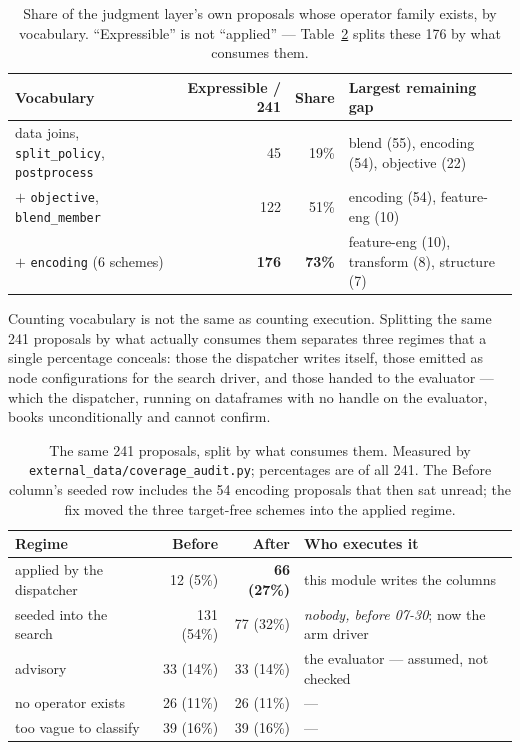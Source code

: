 \documentclass[11pt,a4paper]{article}
\begin{document}
\begin{table}[H]
\centering\small
\caption{Share of the judgment layer's own proposals whose operator family exists, by vocabulary. ``Expressible'' is not ``applied'' --- Table~\ref{tab:regime} splits these 176 by what consumes them.}
\label{tab:coverage}
\begin{tabular}{@{}lrrl@{}}
\toprule
\textbf{Vocabulary} & \textbf{Expressible / 241} & \textbf{Share} & \textbf{Largest remaining gap} \\
\midrule
data joins, \texttt{split\_policy}, \texttt{postprocess} & 45 & 19\% & blend (55), encoding (54), objective (22) \\
$+$ \texttt{objective}, \texttt{blend\_member} & 122 & 51\% & encoding (54), feature-eng (10) \\
$+$ \texttt{encoding} (6 schemes) & \textbf{176} & \textbf{73\%} & feature-eng (10), transform (8), structure (7) \\
\bottomrule
\end{tabular}
\end{table}

Counting vocabulary is not the same as counting execution. Splitting the same 241 proposals by
what actually consumes them separates three regimes that a single percentage conceals: those the
dispatcher writes itself, those emitted as node configurations for the search driver, and those
handed to the evaluator --- which the dispatcher, running on dataframes with no handle on the
evaluator, books unconditionally and cannot confirm.

\begin{table}[H]
\centering\small
\caption{The same 241 proposals, split by what consumes them. Measured by \texttt{external\_data/coverage\_audit.py}; percentages are of all 241. The Before column's seeded row includes the 54 encoding proposals that then sat unread; the fix moved the three target-free schemes into the applied regime.}
\label{tab:regime}
\begin{tabular}{@{}lrrl@{}}
\toprule
\textbf{Regime} & \textbf{Before} & \textbf{After} & \textbf{Who executes it} \\
\midrule
applied by the dispatcher & 12 (5\%) & \textbf{66 (27\%)} & this module writes the columns \\
seeded into the search & 131 (54\%) & 77 (32\%) & \emph{nobody, before 07-30}; now the arm driver \\
advisory & 33 (14\%) & 33 (14\%) & the evaluator --- assumed, not checked \\
\midrule
no operator exists & 26 (11\%) & 26 (11\%) & --- \\
too vague to classify & 39 (16\%) & 39 (16\%) & --- \\
\bottomrule
\end{tabular}
\end{table}
\end{document}
